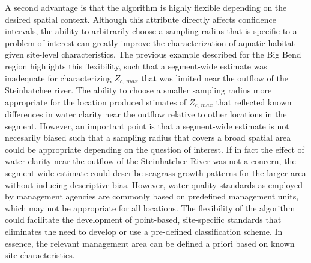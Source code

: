 \documentclass[letterpaper,12pt,oneside]{article}\usepackage[]{graphicx}\usepackage[]{color}
\begin{document}
A second advantage is that the algorithm is highly flexible depending on the desired spatial context.  Although this attribute directly affects confidence intervals, the ability to arbitrarily choose a sampling radius that is specific to a problem of interest can greatly improve the characterization of aquatic habitat given site-level characteristics.  The previous example described for the Big Bend region highlights this flexibility, such that a segment-wide estimate was inadequate for characterizing $Z_{c,\,max}$ that was limited near the outflow of the Steinhatchee river.  The ability to choose a smaller sampling radius more appropriate for the location produced stimates of $Z_{c,\,max}$ that reflected known differences in water clarity near the outflow relative to other locations in the segment.  However, an important point is that a segment-wide estimate is not necesarily biased such that a sampling radius that covers a broad spatial area could be appropriate depending on the question of interest.  If in fact the effect of water clarity near the outflow of the Steinhatchee River was not a concern, the segment-wide estimate could describe seagrass growth patterns for the larger area without inducing descriptive bias.  However, water quality standards as employed by management agencies are commonly based on predefined management units, which may not be appropriate for all locations.  The flexibility of the algorithm could facilitate the development of point-based, site-specific standards that eliminates the need to develop or use a pre-defined classification scheme.  In essence, the relevant management area can be defined a priori based on known site characteristics.
\end{document}
